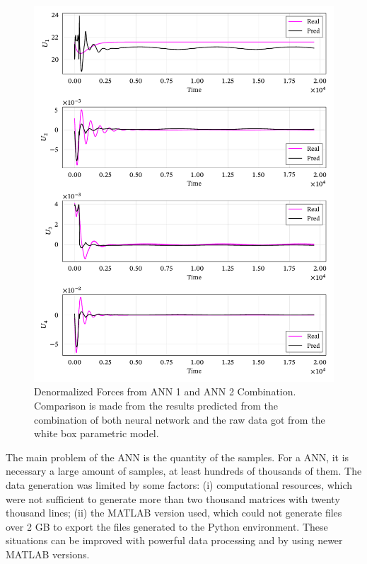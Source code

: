 \begin{figure}[!htb]
    \centering
    \caption[Denormalized Forces from ANN 1 and ANN 2 Combination]{Denormalized Forces from ANN 1 and ANN 2 Combination. Comparison is made from the results predicted from the combination of both neural network and the raw data got from the white box parametric model.}
    \includegraphics{figures/4results/uav/forces_denormalized.pdf}    

    \label{fig:forces_denormalized}
\end{figure}

The main problem of the ANN is the quantity of the samples.
For a ANN, it is necessary a large amount of samples, at least hundreds of thousands of them. 
The data generation was limited by some factors: (i) computational resources, which were not sufficient to generate more than two thousand matrices with twenty thousand lines; (ii) the MATLAB version used, which could not generate files over 2 GB to export the files generated to the Python environment. These situations can be improved with powerful data processing and by using newer MATLAB versions.

